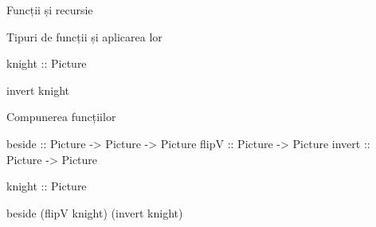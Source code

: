 \documentclass[xcolor=pdftex,romanian,colorlinks]{beamer}
\begin{document}
\begin{section}{Funcții și recursie}
\begin{frame}[fragile]{Tipuri de funcții și aplicarea lor}
\begin{asciihs}
knight :: Picture

invert knight
\end{asciihs}
\vfill
{}
\end{frame}

\begin{frame}[fragile]{Compunerea funcțiilor}
\begin{asciihs}
beside :: Picture -> Picture -> Picture
flipV :: Picture -> Picture
invert :: Picture -> Picture

knight :: Picture

beside (flipV knight) (invert knight)
\end{asciihs}


\end{frame}
\end{section}
\end{document}
